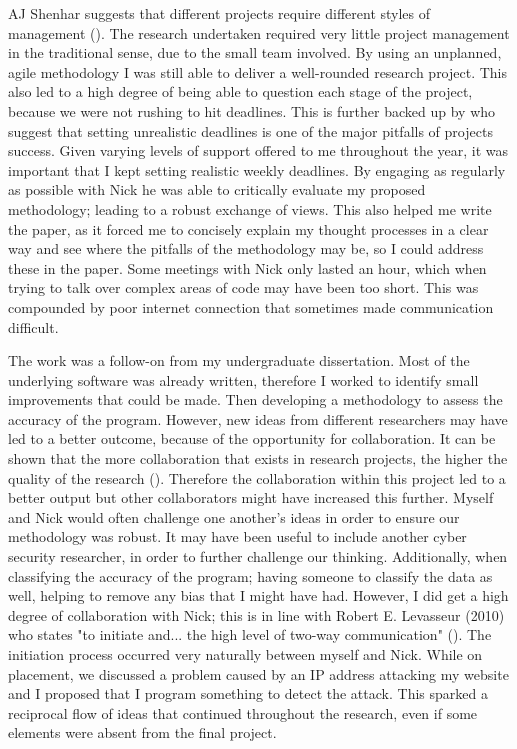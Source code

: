 AJ Shenhar suggests that different projects require different styles of management (\cite{Shenhar1}). The research undertaken required very little project management in the traditional sense, due to the small team involved. By using an unplanned, agile methodology I was still able to deliver a well-rounded research project. This also led to a high degree of being able to question each stage of the project, because we were not rushing to hit deadlines. This is further backed up by \citeauthor{GanttPRO} who suggest that setting unrealistic deadlines is one of the  major pitfalls of projects success. Given varying levels of support offered to me throughout the year, it was important that I kept setting realistic weekly deadlines. By engaging as regularly as possible with Nick he was able to critically evaluate my proposed methodology; leading to a robust exchange of views. This also helped me write the paper, as it forced me to concisely explain my thought processes in a clear way and see where the pitfalls of the methodology may be, so I could address these in the paper. Some meetings with Nick only lasted an hour, which when trying to talk over complex areas of code may have been too short. This was compounded by poor internet connection that sometimes made communication difficult.



The work was a follow-on from my undergraduate dissertation. Most of the underlying software was already written, therefore I worked to identify small improvements that could be made. Then developing a methodology to assess the accuracy of the program. However, new ideas from different researchers may have led to a better outcome, because of the opportunity for collaboration. It can be shown that the more collaboration that exists in research projects, the higher the quality of the research (\cite{figg2006scientific}). Therefore the collaboration within this project led to a better output but other collaborators might have increased this further. Myself and Nick would often challenge one another's ideas in order to ensure our methodology was robust. It may have been useful to include another cyber security researcher, in order to further challenge our thinking. Additionally, when classifying the accuracy of the program; having someone to classify the data as well, helping to remove any bias that I might have had. However, I did get a high degree of collaboration with Nick; this is in line with Robert E. Levasseur (2010) who states "to initiate and... the high level of two-way communication" (\cite{levasseur2010people}). The initiation process occurred very naturally between myself and Nick. While on placement, we discussed a problem caused by an IP address attacking my website and I proposed that I program something to detect the attack. This sparked a reciprocal flow of ideas that continued throughout the research, even if some elements were absent from the final project. 



